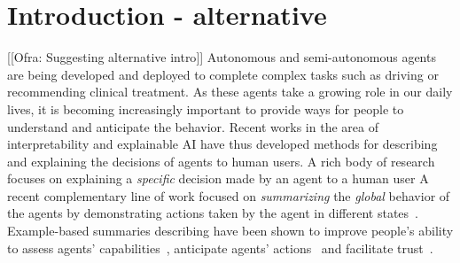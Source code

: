 \documentclass{article}
\newcommand{\comment}[2]{{\color{blue} [[{#1}: {#2}]]}}
\begin{document}
\section{Introduction - alternative}
\comment{Ofra}{Suggesting alternative intro}
Autonomous and semi-autonomous agents are being developed and deployed to complete complex tasks such as driving or recommending clinical treatment. As these agents take a growing role in our daily lives, it is becoming increasingly important to provide ways for people to understand and anticipate the behavior. Recent works in the area of interpretability and explainable AI have thus developed methods for describing and explaining the decisions of agents to human users. A rich body of research focuses on explaining a \emph{specific} decision made by an agent to a human user
A recent complementary line of work focused on \emph{summarizing} the \emph{global} behavior of the agents by demonstrating actions taken by the agent in different states~\cite{amir2018highlights,amir2018agent,huang17communicate,huang2018establishing}. Example-based summaries describing have been shown to improve people's ability to assess agents' capabilities~\cite{amir2018highlights,huang2018establishing}, anticipate agents' actions~\cite{huang17communicate} and facilitate trust~\cite{huang2018establishing}. 
\end{document}
